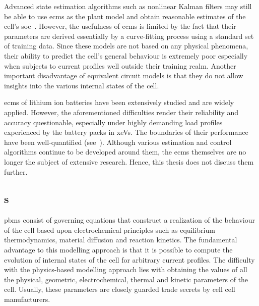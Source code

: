 Advanced state estimation algorithms such  as nonlinear Kalman filters may still
be able to use \glspl{ecm} as the plant model and obtain reasonable estimates of
the  cell's  \gls{soc}~\cite{Plett2006,  Sun2011}. However,  the  usefulness  of
\glspl{ecm} is limited by the fact that their parameters are derived essentially
by a  curve-fitting process using a  standard set of training  data. Since these
models are  not based on  any physical phenomena,  their ability to  predict the
cell's general behaviour  is extremely poor especially when  subjects to current
profiles well  outside their training  realm. Another important  disadvantage of
equivalent circuit  models is that they  do not allow insights  into the various
internal states of the cell.

\glspl{ecm}  of  lithium  ion  batteries   have  been  extensively  studied  and
are  widely  applied.  However,  the aforementioned  difficulties  render  their
reliability and  accuracy questionable,  especially under highly  demanding load
profiles  experienced by  the battery  packs in  \glspl{xeV}. The  boundaries of
their  performance have  been well-quantified  (see~\cite{Plett2015,Plett2016}).
Although  various estimation  and control  algorithms continue  to be  developed
around them, the  \glspl{ecm} themselves are no longer the  subject of extensive
research. Hence, this thesis does not discuss them further.

\subsection{s}


\glspl{pbm} consist of  governing equations that construct a  realization of the
behaviour of the cell based  upon electrochemical principles such as equilibrium
thermodynamics,  material  diffusion  and  reaction  kinetics.  The  fundamental
advantage  to this  modelling approach  is that  it is  possible to  compute the
evolution of  internal states of  the cell  for arbitrary current  profiles. The
difficulty with  the physics-based  modelling approach  lies with  obtaining the
values  of all  the physical,  geometric, electrochemical,  thermal and  kinetic
parameters  of the  cell. Usually,  these parameters  are closely  guarded trade
secrets by cell cell manufacturers.

